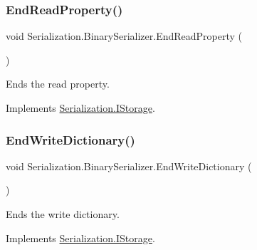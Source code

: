 \subsubsection{\texorpdfstring{End\+Read\+Property()}{EndReadProperty()}}
{\footnotesize\ttfamily void Serialization.\+Binary\+Serializer.\+End\+Read\+Property (\begin{DoxyParamCaption}{ }\end{DoxyParamCaption})\hspace{0.3cm}{\ttfamily [inline]}}



Ends the read property. 



Implements \hyperlink{interface_serialization_1_1_i_storage_a5193e529b49bfccf51f893ebcabc8e80}{Serialization.\+I\+Storage}.

\mbox{\label{class_serialization_1_1_binary_serializer_a16b991b1614cfe83fbb7479b0de03368}} 
\subsubsection{\texorpdfstring{End\+Write\+Dictionary()}{EndWriteDictionary()}}
{\footnotesize\ttfamily void Serialization.\+Binary\+Serializer.\+End\+Write\+Dictionary (\begin{DoxyParamCaption}{ }\end{DoxyParamCaption})\hspace{0.3cm}{\ttfamily [inline]}}



Ends the write dictionary. 



Implements \hyperlink{interface_serialization_1_1_i_storage_ad04875ff178a85ce0054eab86a277fd3}{Serialization.\+I\+Storage}.

\mbox{\label{class_serialization_1_1_binary_serializer_a82fe2baa2c969b618c2729a8113edaa1}} 
